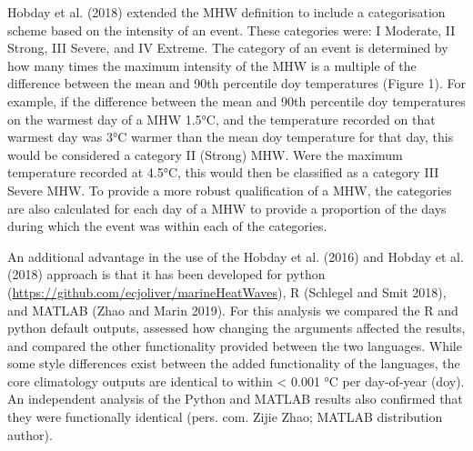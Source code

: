 \documentclass[]{article}
\begin{document}
Hobday et al. (2018) extended the MHW definition to include a
categorisation scheme based on the intensity of an event. These
categories were: I Moderate, II Strong, III Severe, and IV Extreme. The
category of an event is determined by how many times the maximum
intensity of the MHW is a multiple of the difference between the mean
and 90th percentile doy temperatures (Figure 1). For example, if the
difference between the mean and 90th percentile doy temperatures on the
warmest day of a MHW 1.5°C, and the temperature recorded on that warmest
day was 3°C warmer than the mean doy temperature for that day, this
would be considered a category II (Strong) MHW. Were the maximum
temperature recorded at 4.5°C, this would then be classified as a
category III Severe MHW. To provide a more robust qualification of a
MHW, the categories are also calculated for each day of a MHW to provide
a proportion of the days during which the event was within each of the
categories.

An additional advantage in the use of the Hobday et al. (2016) and
Hobday et al. (2018) approach is that it has been developed for python
(\url{https://github.com/ecjoliver/marineHeatWaves}), R (Schlegel and
Smit 2018), and MATLAB (Zhao and Marin 2019). For this analysis we
compared the R and python default outputs, assessed how changing the
arguments affected the results, and compared the other functionality
provided between the two languages. While some style differences exist
between the added functionality of the languages, the core climatology
outputs are identical to within \textless{} 0.001 °C per day-of-year
(doy). An independent analysis of the Python and MATLAB results also
confirmed that they were functionally identical (pers. com. Zijie Zhao;
MATLAB distribution author).
\end{document}
